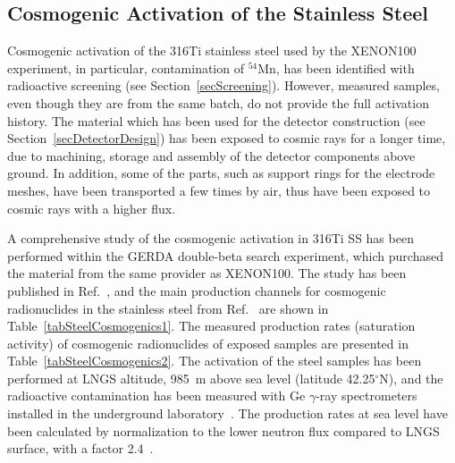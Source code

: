 \subsection{Cosmogenic Activation of the Stainless Steel}
\label{secCosmogenicActivationSteel}

Cosmogenic activation of the 316Ti stainless steel used by the XENON100 experiment, in particular, contamination of $^{54}$Mn, has been identified with radioactive screening (see Section~\ref{secScreening}). However, measured samples, even though they are from the same batch, do not provide the full activation history. The material which has been used for the detector construction (see Section~\ref{secDetectorDesign}) has been exposed to cosmic rays for a longer time, due to machining, storage and assembly of the detector components above ground. In addition, some of the parts, such as support rings for the electrode meshes, have been transported a few times by air, thus have been exposed to cosmic rays with a higher flux.

A comprehensive study of the cosmogenic activation in 316Ti SS has been performed within the GERDA double-beta search experiment, which purchased the material from the same provider as XENON100. The study has been published in Ref.~\cite{SteelCosmogenics}, and the main production channels for cosmogenic radionuclides in the stainless steel from Ref.~\cite{SteelCosmogenics} are shown in Table~\ref{tabSteelCosmogenics1}. The measured  production rates (saturation activity) of cosmogenic radionuclides of exposed samples are presented in Table~\ref{tabSteelCosmogenics2}. The activation of the steel samples has been performed at LNGS altitude, 985~m above sea level (latitude 42.25$^{\circ}$N), and the radioactive contamination has been measured with Ge $\gamma$-ray spectrometers installed in the underground laboratory~\cite{SteelGerda}. The production rates at sea level have been calculated by normalization to the lower neutron flux compared to LNGS surface, with a factor 2.4~\cite{PRnormalization}.

